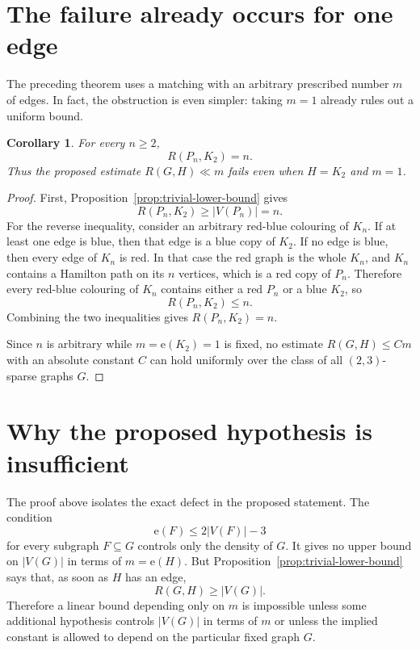 \documentclass[11pt]{amsart}
\newtheorem{corollary}[theorem]{Corollary}
\theoremstyle{remark}
\newcommand{\edg}{\mathrm e}
\begin{document}
\section{The failure already occurs for one edge}

The preceding theorem uses a matching with an arbitrary prescribed number $m$ of edges.  In fact, the obstruction is even simpler: taking $m=1$ already rules out a uniform bound.

\begin{corollary}\label{cor:path-k2}
For every $n\ge 2$,
\[
        R(P_n,K_2)=n.
\]
Thus the proposed estimate $R(G,H)\ll m$ fails even when $H=K_2$ and $m=1$.
\end{corollary}

\begin{proof}
First, Proposition~\ref{prop:trivial-lower-bound} gives
\[
        R(P_n,K_2)\ge |V(P_n)|=n.
\]
For the reverse inequality, consider an arbitrary red-blue colouring of $K_n$.  If at least one edge is blue, then that edge is a blue copy of $K_2$.  If no edge is blue, then every edge of $K_n$ is red.  In that case the red graph is the whole $K_n$, and $K_n$ contains a Hamilton path on its $n$ vertices, which is a red copy of $P_n$.  Therefore every red-blue colouring of $K_n$ contains either a red $P_n$ or a blue $K_2$, so
\[
        R(P_n,K_2)\le n.
\]
Combining the two inequalities gives $R(P_n,K_2)=n$.

Since $n$ is arbitrary while $m=\edg(K_2)=1$ is fixed, no estimate $R(G,H)\le C m$ with an absolute constant $C$ can hold uniformly over the class of all $(2,3)$-sparse graphs $G$.
\end{proof}

\section{Why the proposed hypothesis is insufficient}

The proof above isolates the exact defect in the proposed statement.  The condition
\[
        \edg(F)\le 2|V(F)|-3
\]
for every subgraph $F\subseteq G$ controls only the density of $G$.  It gives no upper bound on $|V(G)|$ in terms of $m=\edg(H)$.  But Proposition~\ref{prop:trivial-lower-bound} says that, as soon as $H$ has an edge,
\[
        R(G,H)\ge |V(G)|.
\]
Therefore a linear bound depending only on $m$ is impossible unless some additional hypothesis controls $|V(G)|$ in terms of $m$ or unless the implied constant is allowed to depend on the particular fixed graph $G$.
\end{document}
